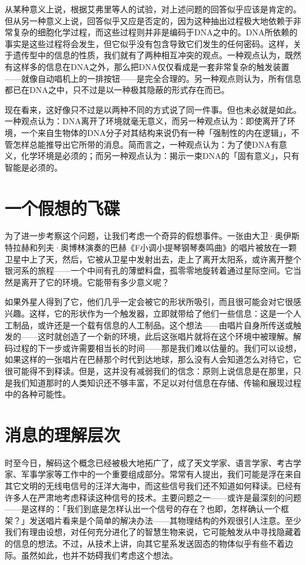\documentclass[
  12pt,
  twoside,
  openright,
  oldfontcommands,
]{memoir}
\begin{document}
从某种意义上说，根据艾弗里等人的试验，对上述问题的回答似乎应该是肯定的。但从另一种意义上说，回答似乎又应是否定的，因为这种抽出过程极大地依赖于非常复杂的细胞化学过程，而这些过程则并非是编码于DNA之中的。DNA所依赖的事实是这些过程将会发生，但它似乎没有包含导致它们发生的任何密码。这样，关于遗传型中的信息的性质，我们就有了两种相互冲突的观点。一种观点认为，既然有这样多的信息在DNA之外，那么把DNA仅仅看成是一套非常复杂的触发装置------就像自动唱机上的一排按钮------是完全合理的。另一种观点则认为，所有信息都已在DNA之中，只不过是以一种极其隐蔽的形式存在而已。

现在看来，这好像只不过是以两种不同的方式说了同一件事。但也未必就是如此。一种观点认为：DNA离开了环境就毫无意义，而另一种观点认为：即使离开了环境，一个来自生物体的DNA分子对其结构来说仍有一种「强制性的内在逻辑」，不管怎样总能推导出它所带的消息。简而言之，一种观点认为：为了使DNA有意义，化学环境是必须的；而另一种观点认为：揭示一束DNA的「固有意义」，只有智能是必须的。

\section{一个假想的飞碟}

为了进一步考察这个问题，让我们考虑一个奇异的假想事件。一张由大卫·奥伊斯特拉赫和列夫·奥博林演奏的巴赫《F小调小提琴钢琴奏鸣曲》的唱片被放在一颗卫星中上了天，然后，它被从卫星中发射出去，走上了离开太阳系，或许离开整个银河系的旅程------一个中间有孔的薄塑料盘，孤零零地旋转着通过星际空间。它当然是离开了它的环境。它能带有多少意义呢？

如果外星人得到了它，他们几乎一定会被它的形状所吸引，而且很可能会对它很感兴趣。这样，它的形状作为一个触发器，立即就带给了他们一些信息：这是一个人工制品，或许还是一个载有信息的人工制品。这个想法------由唱片自身所传送或触发的------这时就创造了一个新的环境，此后这张唱片就将在这个环境中被理解。解码过程的下一步或许需要相当长的时间------那是我们难以估量的。我们可以设想，如果这样的一张唱片在巴赫那个时代到达地球，那么没有人会知道怎么对待它，它很可能得不到释读。但是，这并没有减弱我们的信念：原则上说信息是在那里，只是我们知道那时的人类知识还不够丰富，不足以对付信息在存储、传输和展现过程中的各种可能性。

\section{消息的理解层次}

时至今日，解码这个概念已经被极大地拓广了，成了天文学家、语言学家、考古学家、军事学家等工作中的一个重要组成部分。常常有人提出，我们可能是浮在来自其它文明的无线电信号的汪洋大海中，而这些信号我们还不知道如何释读。已经有许多人在严肃地考虑释读这种信号的技术。主要问题之一------或许是最深刻的问题------是这样的：「我们到底是怎样认出一个信号的存在？也即，怎样确认一个框架？」发送唱片看来是个简单的解决办法------其物理结构的外观很引人注意。至少我们有理由设想，对任何充分进化了的智慧生物来说，它可能触发从中寻找隐藏着的信息的想法。不过，从技术上讲，向其它星系发送固态的物体似乎有些不着边际。虽然如此，也并不妨碍我们考虑这个想法。
\end{document}
